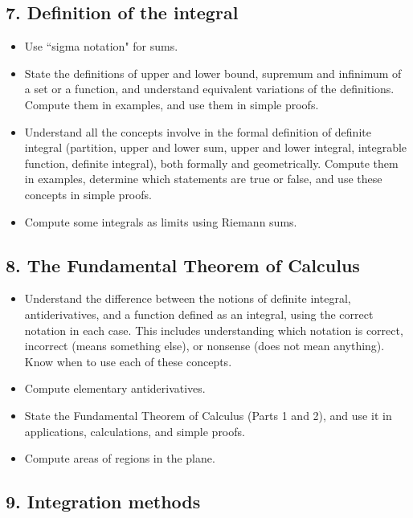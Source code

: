 \documentclass[11pt]{article}
\begin{document}
\subsection{7. Definition of the integral} \label{unit7}

	\begin{itemize}
		\item Use ``sigma notation" for sums.
		\item State the definitions of upper and lower bound, supremum and infinimum of a set or a function, and understand equivalent variations of the definitions.  Compute them in examples, and use them in simple proofs.
		\item  Understand all the concepts involve in the formal definition of definite integral (partition, upper and lower sum, upper and lower integral, integrable function, definite integral), both formally and geometrically.  Compute them in examples, determine which statements are true or false, and use these concepts in simple proofs.
		\item Compute some integrals as limits using Riemann sums.
	\end{itemize}

\subsection{8. The Fundamental Theorem of Calculus} \label{unit8}

	\begin{itemize}
		\item  Understand the difference between the notions of definite integral, antiderivatives, and a function defined as an integral, using the correct notation in each case.  This includes understanding which notation is correct, incorrect (means something else), or nonsense (does not mean anything).  Know when to use each of these concepts. 
		\item  Compute elementary antiderivatives.
		\item  State the Fundamental Theorem of Calculus (Parts 1 and 2), and use it in applications, calculations, and simple proofs.
		\item Compute areas of regions in the plane.
	\end{itemize}

\subsection{9. Integration methods} \label{unit9}
\end{document}
